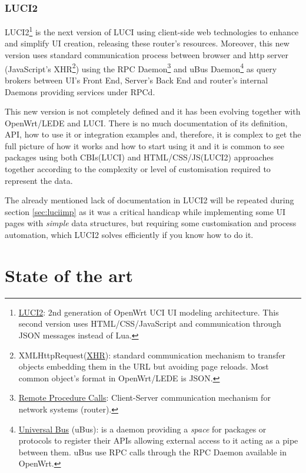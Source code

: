 \subsubsection{LUCI2}
\label{sub:sub:luci2}
LUCI2\footnote{\href{https://wiki.openwrt.org/doc/techref/luci2}{LUCI2}: 2nd generation of OpenWrt UCI UI modeling architecture. This second version uses HTML/CSS/JavaScript and communication through JSON messages instead of Lua.} is the next version of LUCI using client-side web technologies to enhance and simplify UI creation, releasing these router's resources. Moreover, this new version uses standard communication process between browser and http server (JavaScript's XHR\footnote{XMLHttpRequest(\href{https://xhr.spec.whatwg.org/}{XHR}): standard communication mechanism to transfer objects embedding them in the URL but avoiding page reloads. Most common object's format in OpenWrt/LEDE is JSON.}) using the RPC Daemon\footnote{\href{https://wiki.openwrt.org/doc/techref/rpcd}{Remote Procedure Calls}: Client-Server communication mechanism for network systems (router).} and uBus Daemon\footnote{\href{https://wiki.openwrt.org/doc/techref/ubus}{Universal Bus} (uBus): is a daemon providing a \textit{space} for packages or protocols to register their APIs allowing external access to it acting as a pipe between them. uBus use RPC calls through the RPC Daemon available in OpenWrt.} as query brokers between UI's Front End, Server's Back End and router's internal Daemons providing services under RPCd.

This new version is not completely defined and it has been evolving together with OpenWrt/LEDE and LUCI. There is no much documentation of its definition, API, how to use it or integration examples and, therefore, it is complex to get the full picture of how it works and how to start using it and it is common to see packages using both CBIs(LUCI) and HTML/CSS/JS(LUCI2) approaches together according to the complexity or level of customisation required to represent the data.

The already mentioned lack of documentation in LUCI2 will be repeated during section \ref{sec:luciimp} as it was a critical handicap while implementing some UI pages with \textit{simple} data structures, but requiring some customisation and process automation, which LUCI2 solves efficiently if you know how to do it.

\section{State of the art}
\label{sec:soa}
